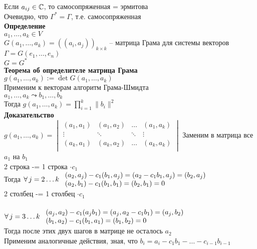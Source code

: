 \documentclass[12pt]{article}
\begin{document}
Если $a_{ij} \in \mathbb{C}$, то самосопряженная = эрмитова\\
Очевидно, что $\Gamma^* = \Gamma$, т.е. самосопряженная\\
\textbf{Определение}\\
$a_1, \ldots, a_k \in V$\\
$G(a_1,\ldots, a_k) = ((a_i, a_j))_{k\times k}$ -- матрица Грама для системы векторов\\
$\Gamma = G(e_1,\ldots, e_n)$\\
$G = G^*$\\
\textbf{Теорема об определителе матрица Грама}\\
$g(a_1, \ldots, a_k) := \det G(a_1,\ldots, a_k)$\\
Применим к векторам алгоритм Грама-Шмидта\\
$a_1, \ldots, a_k \leadsto b_1, \ldots, b_k$\\
Тогда $g(a_1, \ldots, a_k) = \prod_{i=1}^k \|b_i\|^2$\\
\textbf{Доказательство}\\
$g(a_1, \ldots, a_k) = \begin{vmatrix}
    (a_1, a_1) & (a_1, a_2) & \ldots & (a_1, a_k)\\
    \vdots & \ddots & \ddots & \vdots\\
    (a_k, a_1) & (a_k, a_2) & \ldots & (a_k, a_k)\\
\end{vmatrix}$
Заменим в матрица все $a_1$ на $b_1$\\
2 строка -= 1 строка $\cdot c_1$\\
Тогда $\forall\, j = 2\ldots k\ \begin{array}{ll}
    (a_2, a_j) - c_1 (b_1, a_j) = (a_2-c_1b_1, a_j) = (b_2, a_j)\\
    (a_2, b_1) - c_1(b_1,b_1) = (b_2, b_1) = 0
\end{array}$\\
2 столбец -= 1 столбец $\cdot c_1$\\\\
$\forall\, j=3\ldots k\ \begin{array}{ll}
    (a_j, a_2) - c_1(a_j b_1) = (a_j, a_2 - c_1 b_1) = (a_j, b_2)\\
    (b_1, a_2) - c_1(b_1, a_1) = (b_1, b_2) = 0
\end{array}$\\
Тогда после этих двух шагов в матрице не осталось $a_2$\\
Применим аналогичные действия, зная, что $b_i = a_i - c_1 b_1 - \ldots - c_{i-1}b_{i-1}$\\
\end{document}
